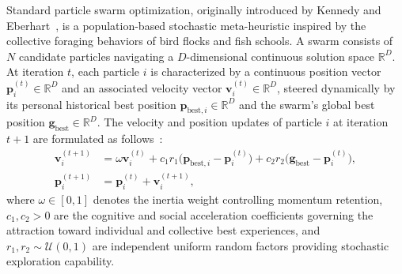 Standard particle swarm optimization, originally introduced by Kennedy and Eberhart~\cite{kennedy1995}, is a population-based stochastic meta-heuristic inspired by the collective foraging behaviors of bird flocks and fish schools. A swarm consists of $N$ candidate particles navigating a $D$-dimensional continuous solution space $\mathbb{R}^D$. At iteration $t$, each particle $i$ is characterized by a continuous position vector $\mathbf{p}_i^{(t)} \in \mathbb{R}^D$ and an associated velocity vector $\mathbf{v}_i^{(t)} \in \mathbb{R}^D$, steered dynamically by its personal historical best position $\mathbf{p}_{\mathrm{best},i} \in \mathbb{R}^D$ and the swarm's global best position $\mathbf{g}_{\mathrm{best}} \in \mathbb{R}^D$. The velocity and position updates of particle $i$ at iteration $t+1$ are formulated as follows~\cite{shi1998}:
\begin{align}
\mathbf{v}_i^{(t+1)} &= \omega \mathbf{v}_i^{(t)} + c_1 r_1 \bigl(\mathbf{p}_{\mathrm{best},i} - \mathbf{p}_i^{(t)}\bigr) + c_2 r_2 \bigl(\mathbf{g}_{\mathrm{best}} - \mathbf{p}_i^{(t)}\bigr), \label{eq:pso_velocity} \\
\mathbf{p}_i^{(t+1)} &= \mathbf{p}_i^{(t)} + \mathbf{v}_i^{(t+1)}, \label{eq:pso_position}
\end{align}
where $\omega \in [0, 1]$ denotes the inertia weight controlling momentum retention, $c_1, c_2 > 0$ are the cognitive and social acceleration coefficients governing the attraction toward individual and collective best experiences, and $r_1, r_2 \sim \mathcal{U}(0, 1)$ are independent uniform random factors providing stochastic exploration capability.

